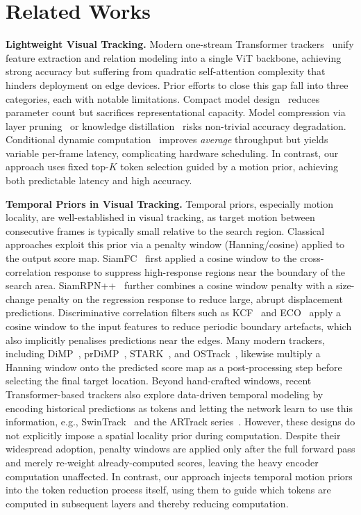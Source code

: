 \section{Related Works}
\label{RelatedWorks}
\textbf{Lightweight Visual Tracking.}
Modern one-stream Transformer trackers~\cite{ostrack, mixformer, mixformerv2, artrack, simtrack} unify feature extraction and relation modeling into a single ViT backbone, achieving strong accuracy but suffering from quadratic self-attention complexity that hinders deployment on edge devices.
Prior efforts to close this gap fall into three categories, each with notable limitations.
Compact model design~\cite{fear, HCAT, ETTrack, HiT, LiteTrack, AVTrack} reduces parameter count but sacrifices representational capacity.
Model compression via layer pruning~\cite{LiteTrack, mixformerv2} or knowledge distillation~\cite{compressTracker, mixformerv2} risks non-trivial accuracy degradation.
Conditional dynamic computation~\cite{AVTrack, wu2024learning, abavitrack} improves \emph{average} throughput but yields variable per-frame latency, complicating hardware scheduling.
In contrast, our approach uses fixed top-$K$ token selection guided by a motion prior, achieving both predictable latency and high accuracy.

\textbf{Temporal Priors in Visual Tracking.}
Temporal priors, especially motion locality, are well-established in visual tracking, as target motion between consecutive frames is typically small relative to the search region. Classical approaches exploit this prior via a penalty window (Hanning/cosine) applied to the output score map. SiamFC~\cite{SiamFC} first applied a cosine window to the cross-correlation response to suppress high-response regions near the boundary of the search area. SiamRPN++~\cite{SiamRPN++} further combines a cosine window penalty with a size-change penalty on the regression response to reduce large, abrupt displacement predictions. Discriminative correlation filters such as KCF~\cite{KCF} and ECO~\cite{ECO} apply a cosine window to the input features to reduce periodic boundary artefacts, which also implicitly penalises predictions near the edges. Many modern trackers, including DiMP~\cite{DiMP}, prDiMP~\cite{prDIMP}, STARK~\cite{STARK}, and OSTrack~\cite{ostrack}, likewise multiply a Hanning window onto the predicted score map as a post-processing step before selecting the final target location.
Beyond hand-crafted windows, recent Transformer-based trackers also explore data-driven temporal modeling by encoding historical predictions as tokens and letting the network learn to use this information, e.g., SwinTrack~\cite{lin2022swintrack} and the ARTrack series~\cite{artrack,wang2026fartrack}. However, these designs do not explicitly impose a spatial locality prior during computation.
Despite their widespread adoption, penalty windows are applied only after the full forward pass and merely re-weight already-computed scores, leaving the heavy encoder computation unaffected. In contrast, our approach injects temporal motion priors into the token reduction process itself, using them to guide which tokens are computed in subsequent layers and thereby reducing computation.

